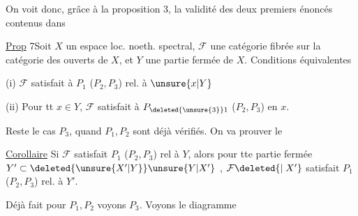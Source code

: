 
On voit donc, grâce à la proposition 3, la validité des deux premiers énoncés contenus dans

\uline{Prop} 7\quad Soit $X$ un espace loc. noeth. spectral, $\mathcal F$ une catégorie fibrée sur la catégorie des ouverts de $X$, et  $Y$ une partie fermée de $X$.  Conditions équivalentes

(i) $\mathcal F$ satisfait à $P_1$ ($P_2,P_3$) rel. à $\unsure{x|Y}$

(ii) Pour tt $x\in Y$, $\mathcal F$ satisfait à $P_{\deleted{\unsure{3}}1}$ ($P_2,P_3$) en $x$.

Reste le cas $P_3$,  quand $P_1,P_2$ sont déjà vérifiés. On va prouver le



\uline{Corollaire} \quad Si $\mathcal F$ satisfait $P_1$ ($P_2,P_3$) rel à $Y$, alors pour  tte partie fermée $Y'\subset \deleted{\unsure{X'|Y}}\unsure{Y|X'}$ , $\mathcal F\deleted{\mid X'}$ satisfait $P_1$ ($P_2,P_3$) rel. à $Y'$.

Déjà fait pour $P_1,P_2$ voyons $P_3$. Voyons le diagramme

